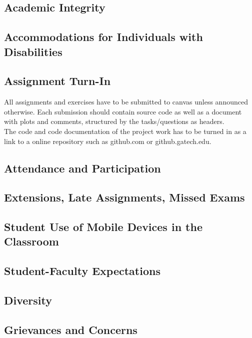 \documentclass[letterpaper,oneside,10pt]{scrartcl}
\begin{document}
    \subsection{Academic Integrity}
        

    \subsection{Accommodations for Individuals with Disabilities}
        
    
    \subsection{Assignment Turn-In}
        All assignments and exercises have to be submitted to canvas unless announced otherwise. Each submission should contain source code as well as a document with plots and comments, structured by the tasks/questions as headers.\\
        The code and code documentation of the project work has to be turned in as a link to a online repository such as github.com or github.gatech.edu. 
    
    \subsection{Attendance and Participation}
        
        
    \subsection{Extensions, Late Assignments, Missed Exams}
        

    \subsection{Student Use of Mobile Devices in the Classroom}
        
        
    \subsection{Student-Faculty Expectations}
        
        
    \subsection{Diversity}
        
        
    \subsection{Grievances and Concerns}
        
\end{document}
